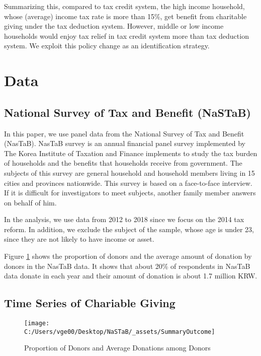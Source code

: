 \documentclass[ review  , 3p ]{elsarticle}
\begin{document}
  Summarizing this, compared to tax credit system, the high income household, whose (average) income tax rate is more than 15\%, get benefit from charitable giving under the tax deduction system. However, middle or low income households would enjoy tax relief in tax credit system more than tax deduction system. We exploit this policy change as an identification strategy.
  
  \hypertarget{data}{%
  \section{Data}\label{data}}
  
  \hypertarget{national-survey-of-tax-and-benefit-nastab}{%
  \subsection{National Survey of Tax and Benefit (NaSTaB)}\label{national-survey-of-tax-and-benefit-nastab}}
  
  In this paper, we use panel data from the National Survey of Tax and Benefit (NasTaB).
  NasTaB survey is an annual financial panel survey implemented by The Korea Institute of Taxation and Finance implements to study the tax burden of households and the benefits that households receive from government. The subjects of this survey are general household and household members living in 15 cities and provinces nationwide. This survey is based on a face-to-face interview. If it is difficult for investigators to meet subjects, another family member answers on behalf of him.
  
  In the analysis, we use data from 2012 to 2018 since \color{red}we focus on the 2014 tax reform.
  \color{black}In addition, we exclude the subject of the sample, whose age is under 23, since they are not likely to have income or asset.
  
  Figure \ref{fig:figDonationRate} shows the proportion of donors and the average amount of donation by donors in the NasTaB data. It shows that about 20\% of respondents in NasTaB data donate in each year and their amount of donation is about 1.7 million KRW.
  
  \hypertarget{time-series-of-chariable-giving}{%
  \subsection{Time Series of Chariable Giving}\label{time-series-of-chariable-giving}}
  
  \begin{figure}
  
  {\centering \texttt{[image: C:/Users/vge00/Desktop/NaSTaB/\_assets/SummaryOutcome]} 
  
  }
  
  \caption{Proportion of Donors and Average Donations among Donors}\label{fig:figDonationRate}
  \end{figure}
  
\end{document}
